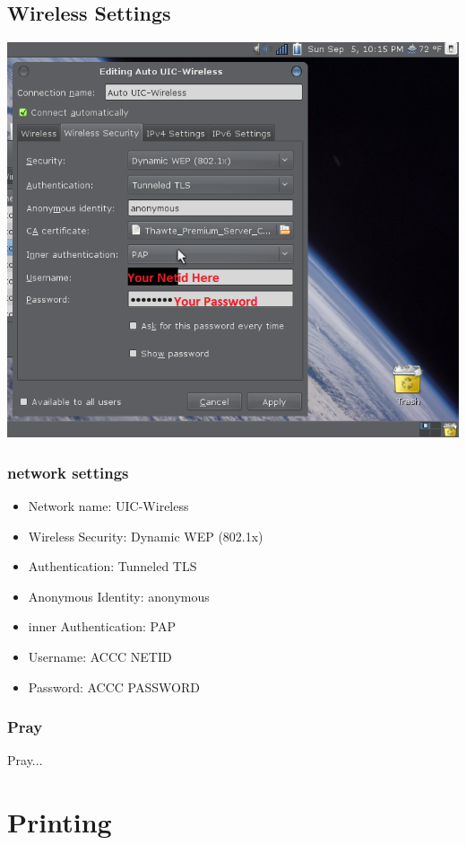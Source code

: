 \documentclass[hyperref={pdfpagelabels=false}]{beamer}
\begin{document}
\subsection{Wireless Settings}
\frame
{
     \includegraphics[totalheight=0.8\textheight]{uicwirelessstep2.png}
}
\frame
{
    \frametitle{network settings}
    \begin{itemize}
    \item{Network name: UIC-Wireless}
    \item{Wireless Security: Dynamic WEP (802.1x)}
    \item{Authentication: Tunneled TLS}
    \item{Anonymous Identity: anonymous}
    \item{inner Authentication: PAP}
    \item{Username: ACCC NETID}
    \item{Password: ACCC PASSWORD}
    \end{itemize}
}
\frame
{
    \frametitle{Pray}
    Pray...
}
\section{Printing}
\end{document}
